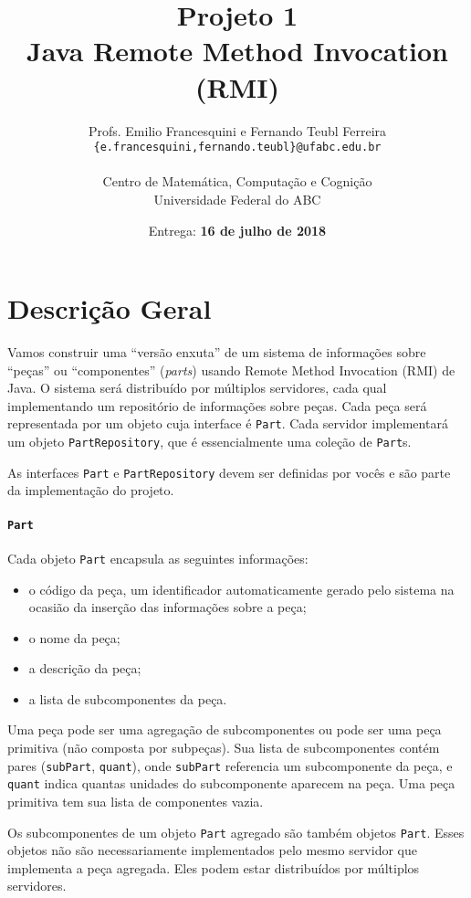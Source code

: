 \documentclass[oneside,12pt,a4paper]{memoir}
\title{Projeto 1\\ Java Remote Method Invocation (RMI)}
\author{Profs. Emilio Francesquini e Fernando Teubl Ferreira\\
  \texttt{\{e.francesquini,fernando.teubl\}@ufabc.edu.br} \\
  \mbox{}\\
  Centro de Matemática, Computação e Cognição\\
  Universidade Federal do ABC}
\date{Entrega: \textbf{16 de julho de 2018}}
\begin{document}
\maketitle

\section*{Descrição Geral}

Vamos construir uma ``versão enxuta'' de um sistema de informações
sobre ``peças'' ou ``componentes'' (\textit{parts}) usando Remote
Method Invocation (RMI) de Java. O sistema será distribuído por
múltiplos servidores, cada qual implementando um repositório de
informações sobre peças. Cada peça será representada por um objeto
cuja interface é \texttt{Part}. Cada servidor implementará um objeto
\texttt{PartRepository}, que é essencialmente uma coleção de
\texttt{Part}s.

As interfaces \texttt{Part} e \texttt{PartRepository} devem ser
definidas por vocês e são parte da implementação do projeto.

\paragraph{\texttt{Part}}

Cada objeto \texttt{Part} encapsula as seguintes informações:

\begin{itemize}
\item o código da peça, um identificador automaticamente gerado pelo sistema na ocasião da inserção das informações sobre a peça;
\item o nome da peça;
\item a descrição da peça;
\item a lista de subcomponentes da peça.
\end{itemize}

Uma peça pode ser uma agregação de subcomponentes ou pode ser uma peça
primitiva (não composta por subpeças). Sua lista de subcomponentes
contém pares (\texttt{subPart}, \texttt{quant}), onde \texttt{subPart}
referencia um subcomponente da peça, e \texttt{quant} indica quantas
unidades do subcomponente aparecem na peça. Uma peça primitiva tem sua
lista de componentes vazia.

Os subcomponentes de um objeto \texttt{Part} agregado são também
objetos \texttt{Part}. Esses objetos não são necessariamente
implementados pelo mesmo servidor que implementa a peça agregada. Eles
podem estar distribuídos por múltiplos servidores.
\end{document}
